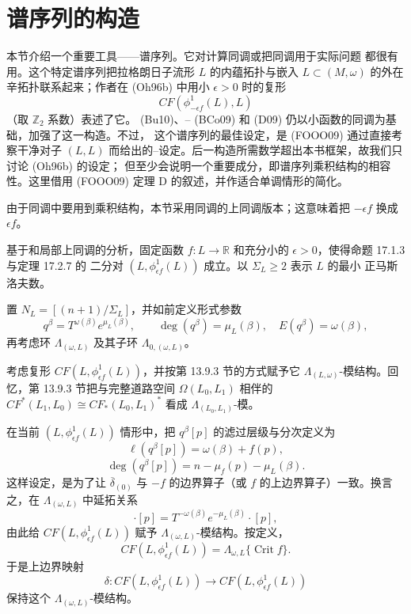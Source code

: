 \section{谱序列的构造}
\label{sec:construction-spectral-sequence}

本节介绍一个重要工具——谱序列。它对计算\personFloer{}同调或把\personFloer{}同调用于实际问题
都很有用。这个特定谱序列把拉格朗日子流形 $L$ 的内蕴拓扑与嵌入
$L\subset(M,\omega)$ 的外在辛拓扑联系起来；作者在 (Oh96b) 中用小
$\epsilon>0$ 时的\personFloer{}复形
\[
 CF(\phi_{-\epsilon f}^1(L),L)
\]
（取 $\mathbb Z_2$ 系数）表述了它。\personBuhovsky{} (Bu10)、\personBiran{}--\personOctavianCornea{} (BCo09)
和\personDamian{} (D09) 仍以小\personMorse{}函数的\personMorse{}同调为基础，加强了这一构造。不过，
这个谱序列的最佳设定，是 (FOOO09) 通过直接考察干净对子 $(L,L)$ 而给出的\personBott{}--\personMorse{}设定。后一构造所需数学超出本书框架，故我们只讨论 (Oh96b) 的设定；
但至少会说明一个重要成分，即谱序列乘积结构的相容性。这里借用 (FOOO09) 定理 D
的叙述，并作适合单调情形的简化。

由于\personFloer{}同调中要用到乘积结构，本节采用\personFloer{}同调的上同调版本；这意味着把
$-\epsilon f$ 换成 $\epsilon f$。

基于\termThickThinDichotomy{}和局部\personFloer{}上同调的分析，固定\personMorse{}函数
$f:L\to\mathbb R$ 和充分小的 $\epsilon>0$，使得命题 17.1.3 与定理 17.2.7 的
二分对 $(L,\phi_{\epsilon f}^1(L))$ 成立。以 $\Sigma_L\geq2$ 表示 $L$ 的最小
正马斯洛夫数。

置 $N_L=[(n+1)/\Sigma_L]$，并如前定义形式参数
\[
 q^\beta=T^{\omega(\beta)}e^{\mu_L(\beta)},
 \qquad
 \deg(q^\beta)=\mu_L(\beta),\quad E(q^\beta)=\omega(\beta),
\]
再考虑\personNovikov{}环 $\Lambda_{(\omega,L)}$ 及其子环
$\Lambda_{0,(\omega,L)}$。

考虑\personFloer{}复形 $CF(L,\phi_{\epsilon f}^1(L))$，并按第 13.9.3 节的方式赋予它
$\Lambda_{(L,\omega)}$-模结构。回忆，第 13.9.3 节把与完整道路空间
$\Omega(L_0,L_1)$ 相伴的
$CF^*(L_1,L_0)\cong CF_*(L_0,L_1)^*$ 看成 $\Lambda_{(L_0,L_1)}$-模。

在当前 $(L,\phi_{\epsilon f}^1(L))$ 情形中，把 $q^\beta[p]$ 的滤过层级与分次定义为
\begin{equation}
 \ell(q^\beta[p])=\omega(\beta)+f(p),
\label{eq:17-filtration-q-beta-p}
\end{equation}
\begin{equation}
 \deg(q^\beta[p])=n-\mu_f(p)-\mu_L(\beta).
\label{eq:17-grading-q-beta-p}
\end{equation}
这样设定，是为了让 $\overline\delta_{(0)}$ 与 $-f$ 的\personMorse{}边界算子（或 $f$ 的\personMorse{}上边界算子）一致。换言之，在 $\Lambda_{(\omega,L)}$ 中延拓关系
\begin{equation}
 [\beta]\cdot[p]=T^{-\omega(\beta)}e^{-\mu_L(\beta)}\cdot[p],
\label{eq:17-module-relation-beta-p}
\end{equation}
由此给 $CF(L,\phi_{\epsilon f}^1(L))$ 赋予 $\Lambda_{(\omega,L)}$-模结构。按定义，
\[
 CF(L,\phi_{\epsilon f}^1(L))=\Lambda_{\omega,L}\{\operatorname{Crit}f\}.
\]
于是上边界映射
\[
 \delta:CF(L,\phi_{\epsilon f}^1(L))\longrightarrow
 CF(L,\phi_{\epsilon f}^1(L))
\]
保持这个 $\Lambda_{(\omega,L)}$-模结构。


